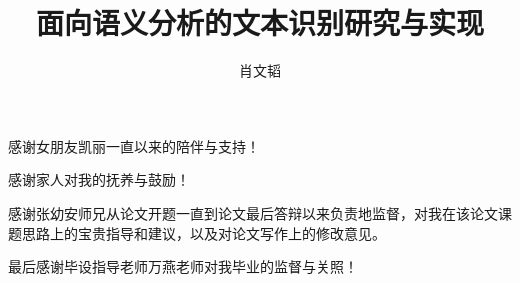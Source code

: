 \documentclass[project, fontset=windows, openany, oneside, submit]{sjtuthesis}
\begin{document}
\title{面向语义分析的文本识别研究与实现}
\author{肖文韬}


\maketitle
\mainmatter
\pagestyle{main}

\tableofcontents


\begin{finish}


\backmatter %
\printbibliography[heading=bibintoc]

\begin{thanks}

感谢女朋友凯丽一直以来的陪伴与支持！

感谢家人对我的抚养与鼓励！

感谢张幼安师兄从论文开题一直到论文最后答辩以来负责地监督，对我在该论文课题思路上的宝贵指导和建议，以及对论文写作上的修改意见。

最后感谢毕设指导老师万燕老师对我毕业的监督与关照！

\end{thanks}

\end{finish}
\end{document}
